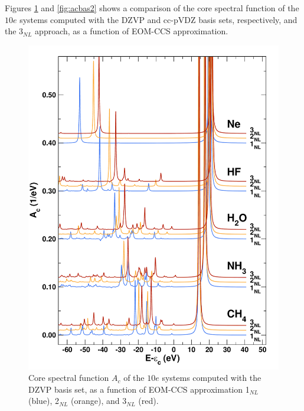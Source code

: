 \documentclass[aps,prb,preprint,groupaddress,floatfix]{revtex4}
\begin{document}
Figures \ref{fig:acbas1} and \ref{fig:acbas2} shows a comparison of the core spectral function of the $10e$ systems computed with the DZVP and cc-pVDZ basis sets, respectively, and the 3$_{NL}$ approach, as a function of EOM-CCS approximation.
\begin{figure}[t]
\includegraphics[scale=0.40,clip]{Fig04-SI.pdf}
\caption{\label{fig:acbas1}
Core spectral function $A_c$ of the $10e$ systems computed with the DZVP basis set, as a function of EOM-CCS approximation 1$_{NL}$ (blue), 2$_{NL}$ (orange), and 3$_{NL}$ (red).
}
\end{figure}
\end{document}
